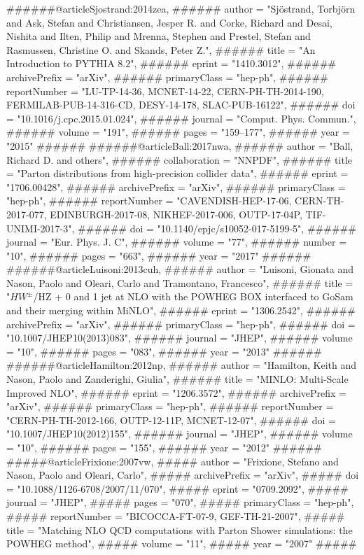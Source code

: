 
######@article{Sjostrand:2014zea,
######    author = "Sjöstrand, Torbjörn and Ask, Stefan and Christiansen, Jesper R. and Corke, Richard and Desai, Nishita and Ilten, Philip and Mrenna, Stephen and Prestel, Stefan and Rasmussen, Christine O. and Skands, Peter Z.",
######    title = "{An Introduction to PYTHIA 8.2}",
######    eprint = "1410.3012",
######    archivePrefix = "arXiv",
######    primaryClass = "hep-ph",
######    reportNumber = "LU-TP-14-36, MCNET-14-22, CERN-PH-TH-2014-190, FERMILAB-PUB-14-316-CD, DESY-14-178, SLAC-PUB-16122",
######    doi = "10.1016/j.cpc.2015.01.024",
######    journal = "Comput. Phys. Commun.",
######    volume = "191",
######    pages = "159--177",
######    year = "2015"
######}
######@article{Ball:2017nwa,
######    author = "Ball, Richard D. and others",
######    collaboration = "NNPDF",
######    title = "{Parton distributions from high-precision collider data}",
######    eprint = "1706.00428",
######    archivePrefix = "arXiv",
######    primaryClass = "hep-ph",
######    reportNumber = "CAVENDISH-HEP-17-06, CERN-TH-2017-077, EDINBURGH-2017-08, NIKHEF-2017-006, OUTP-17-04P, TIF-UNIMI-2017-3",
######    doi = "10.1140/epjc/s10052-017-5199-5",
######    journal = "Eur. Phys. J. C",
######    volume = "77",
######    number = "10",
######    pages = "663",
######    year = "2017"
######}
######@article{Luisoni:2013cuh,
######    author = "Luisoni, Gionata and Nason, Paolo and Oleari, Carlo and Tramontano, Francesco",
######    title = "{$HW^{\pm}$/HZ + 0 and 1 jet at NLO with the POWHEG BOX interfaced to GoSam and their merging within MiNLO}",
######    eprint = "1306.2542",
######    archivePrefix = "arXiv",
######    primaryClass = "hep-ph",
######    doi = "10.1007/JHEP10(2013)083",
######    journal = "JHEP",
######    volume = "10",
######    pages = "083",
######    year = "2013"
######}
######@article{Hamilton:2012np,
######    author = "Hamilton, Keith and Nason, Paolo and Zanderighi, Giulia",
######    title = "{MINLO: Multi-Scale Improved NLO}",
######    eprint = "1206.3572",
######    archivePrefix = "arXiv",
######    primaryClass = "hep-ph",
######    reportNumber = "CERN-PH-TH-2012-166, OUTP-12-11P, MCNET-12-07",
######    doi = "10.1007/JHEP10(2012)155",
######    journal = "JHEP",
######    volume = "10",
######    pages = "155",
######    year = "2012"
######}
#####@article{Frixione:2007vw,
#####    author = "Frixione, Stefano and Nason, Paolo and Oleari, Carlo",
#####    archivePrefix = "arXiv",
#####    doi = "10.1088/1126-6708/2007/11/070",
#####    eprint = "0709.2092",
#####    journal = "JHEP",
#####    pages = "070",
#####    primaryClass = "hep-ph",
#####    reportNumber = "BICOCCA-FT-07-9, GEF-TH-21-2007",
#####    title = "{Matching NLO QCD computations with Parton Shower simulations: the POWHEG method}",
#####    volume = "11",
#####    year = "2007"
#####}
